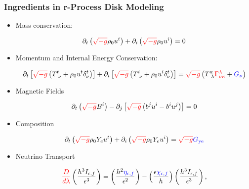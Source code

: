 \documentclass[]{beamer}
\newcommand{\paren}[1]{\left( #1 \right)}
\newcommand{\sqrbrace}[1]{\left[ #1 \right]}
\newcommand{\detg}{\sqrt{-g}}
\newcommand{\eepsilon}{\epsilon} %
\newcommand{\etanuf}{\eta_{\eepsilon,f}}
\newcommand{\Inuf}{I_{\eepsilon,f}}
\newcommand{\chinuf}{\chi_{\eepsilon,f}}
\begin{document}
\begin{frame}
  \frametitle{Ingredients in r-Process Disk Modeling}
  \begin{itemize}
  \item Mass conservation:
    \begin{small}
      \begin{displaymath}
        \partial_t \paren{{\color{red}\detg}\rho_0 u^t}
        + \partial_i\paren{{\color{red}\detg}\rho_0u^i} = 0
      \end{displaymath}
    \end{small}
  \item Momentum and Internal Energy Conservation:
    \begin{small}
      \begin{displaymath}
        \partial_t\sqrbrace{{\color{red}\detg} \paren{T^t_{\ \nu} + \rho_0u^t \delta^t_\nu}}
        + \partial_i\sqrbrace{{\color{red}\detg}\paren{T^i_{\ \nu} + \rho_0 u^i \delta^t_\nu}}
        = {\color{red}\detg} \paren{T^\kappa_{\ \lambda} {\color{red}\Gamma^\lambda_{\nu\kappa}} + {\color{blue}G_\nu}}
      \end{displaymath}
    \end{small}
  \item Magnetic Fields
    \begin{small}
      \begin{displaymath}
        \partial_t \paren{{\color{red}\detg} B^i}
        - \partial_j \sqrbrace{{\color{red}\detg}\paren{b^ju^i - b^i u^j}}
        = 0
      \end{displaymath}
    \end{small}
  \item Composition
    \begin{small}
      \begin{displaymath}
        \partial_t\paren{{\color{red}\detg}\rho_0 Y_e u^t}
        + \partial_i\paren{{\color{red}\detg}\rho_0Y_eu^i}
        = {\color{red}\detg} {\color{blue}G_{\text{ye}}}
      \end{displaymath}
    \end{small}
  \item Neutrino Transport
    \begin{small}
      \begin{displaymath}
        {\color{red}\frac{D}{d\lambda}}\paren{\frac{h^3\Inuf}{\eepsilon^3}}
        = \paren{\frac{h^2{\color{blue}\etanuf}}{\eepsilon^2}}
        - \paren{\frac{\eepsilon {\color{blue}\chinuf}}{h}} \paren{\frac{h^3\Inuf}{\eepsilon^3}},
      \end{displaymath}
    \end{small}
  \end{itemize}
\end{frame}
\end{document}
